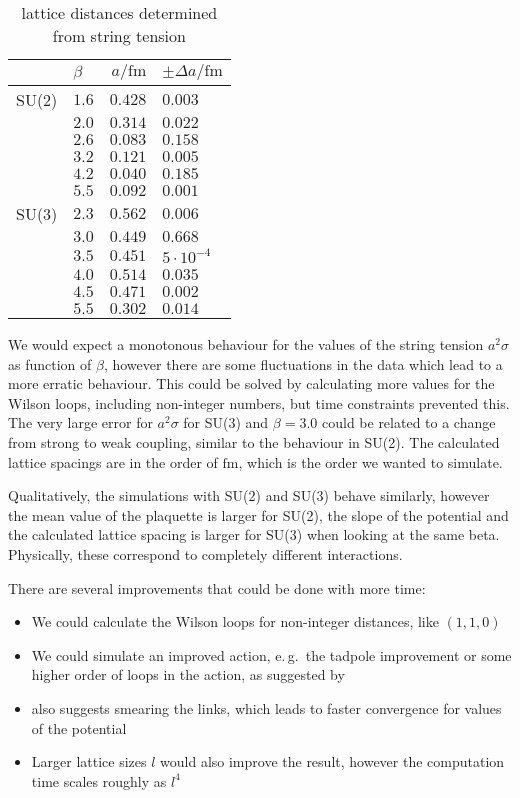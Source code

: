 \documentclass[%
 reprint,
 amsmath,amssymb,
 aps,
]{revtex4-1}
\begin{document}
\begin{table}[htbp]
	\centering
	\begin{tabular}{|r|l|r|l|}
		\hline
		&$\beta$&$a/\si{\femto\meter}$&$\pm\Delta a/\si{\femto\meter}$\\
		\hline
		SU(2)	&$1.6$	&$0.428$	&$0.003$\\
		&$2.0$	&$0.314$	&$0.022$\\
		&$2.6$	&$0.083$	&$0.158$\\
		&$3.2$	&$0.121$	&$0.005$\\
		&$4.2$	&$0.040$	&$0.185$\\
		&$5.5$	&$0.092$	&$0.001$\\
		\hline
		SU(3) 	&$2.3$	&$0.562$	&$0.006$\\
		&$3.0$	&$0.449$	&$0.668$\\
		&$3.5$	&$0.451$	&$5\cdot 10^{-4}$\\
		&$4.0$	&$0.514$	&$0.035$\\
		&$4.5$	&$0.471$	&$0.002$\\
		&$5.5$	&$0.302$	&$0.014$\\
		\hline
	\end{tabular}
	\caption{lattice distances determined from string tension}
	\label{tab:scalesetting}
\end{table}

We would expect a monotonous behaviour for the values of the string tension $a^2\sigma$ as function of $\beta$, however there are some fluctuations in the data which lead to a more erratic behaviour. This could be solved by calculating more values for the Wilson loops, including non-integer numbers, but time constraints prevented this. The very large error for $a^2\sigma$ for SU(3) and $\beta=3.0$ could be related to a change from strong to weak coupling, similar to the behaviour in SU(2). The calculated lattice spacings are in the order of $\si{\femto\meter}$, which is the order we wanted to simulate.

Qualitatively, the simulations with SU(2) and SU(3) behave similarly, however the mean value of the plaquette is larger for SU(2), the slope of the potential and the calculated lattice spacing is larger for SU(3) when looking at the same beta. Physically, these correspond to completely different interactions.

There are several improvements that could be done with more time:
\begin{itemize}
	\item We could calculate the Wilson loops for non-integer distances, like $(1,1,0)$
	\item We could simulate an improved action, e.\,g.\, the tadpole improvement or some higher order of loops in the action, as suggested by \citet{lepagelqcd}
	\item \citet{lepagelqcd} also suggests smearing the links, which leads to faster convergence for values of the potential
	\item Larger lattice sizes $l$ would also improve the result, however the computation time scales roughly as $l^4$
\end{itemize}
\end{document}
